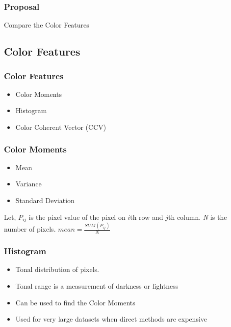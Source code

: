 \documentclass[15pt]{beamer}
\begin{document}
\begin{frame}
\frametitle{Proposal}
Compare the Color Features
\end{frame}

\subsection{Color Features}
\begin{frame}
\frametitle{Color Features}
\pause
\begin{itemize}[label=$\blacksquare$]
\item Color Moments
\pause
\item Histogram
\pause
\item Color Coherent Vector (CCV)
\end{itemize}
\end{frame}


\begin{frame}

\frametitle{Color Moments}
\pause
\begin{itemize}[label=$\blacksquare$]
\item Mean
\pause
\item Variance
\pause
\item Standard Deviation
\pause
\end{itemize}

Let, \textit{$P_{ij}$} is the pixel value of the pixel on $i$th row and $j$th column.
\textit{N} is the number of pixels.\newline \newline
\pause
$mean = \frac{SUM(P_{ij})}{N}$
\end{frame}




\begin{frame}
\frametitle{Histogram}

\begin{itemize}[label=$\blacksquare$]
\item Tonal distribution of pixels.
\item Tonal range is a measurement of darkness or lightness \\[\baselineskip]\pause
\item Can be used to find the Color Moments
\item Used for very large datasets when direct methods are expensive
\end{itemize}
\end{frame}
\end{document}
